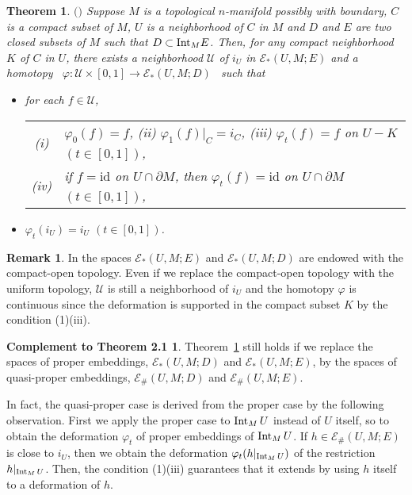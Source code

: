 \documentclass[11pt, fleqn]{amsart}
\newtheorem{theorem}{Theorem}[section]
\theoremstyle{definition}
\newtheorem{remark}{Remark}[section]
\newtheorem*{compl}{Complement to Theorem 2.1}
\newcommand{\cal}{\mathcal}
\renewcommand{\phi}{\varphi}
\newcommand{\lra}{\longrightarrow}
\newcommand{\id}{\mathrm{id}}
\newcommand{\U}{\mathcal U}
\begin{document}
\begin{theorem}\label{thm_basic_deform} $($\cite[Theorem 5.1]{EK}$)$  
Suppose $M$ is a topological $n$-manifold possibly with boundary,  
$C$ is a  compact subset of $M$, 
$U$ is a neighborhood of $C$ in $M$ and 
$D$ and $E$ are two closed subsets of $M$ such that $D \subset {\rm Int}_M E$.
Then, for any compact neighborhood $K$ of $C$ in $U$,  
there exists a neighborhood $\U$ of $i_U$ in ${\mathcal E}_\ast(U, M; E)$ 
and a homotopy \ 
$\varphi : \U \times [0, 1] \lra {\mathcal E}_\ast(U, M; D)$ \  such that 
\begin{itemize}
\item[{\rm (1)}]  for each $f \in {\cal U}$, 
\begin{tabular}[t]{c@{\ \,}l}
{\rm (i)} & $\varphi_0(f) = f$, \hspace{3mm} {\rm (ii)} 
$\varphi_1(f)|_C = i_C$, \hspace{3mm} {\rm (iii)} 
$\varphi_t(f) = f$ on $U - K$ $(t \in [0,1])$, \\[2mm] 
{\rm (iv)} & if $f = \id$ on $U \cap \partial M$, then $\varphi_t(f) = \id$ on $U \cap \partial M$ $(t \in [0,1])$, 
\end{tabular}
\vskip 1.5mm 
\item[{\rm (2)}] $\varphi_t(i_U) = i_U$ $(t \in [0,1])$. 
\end{itemize}
\end{theorem} 

\begin{remark}
In \cite{EK} the spaces ${\mathcal E}_\ast(U, M; E)$ and ${\mathcal E}_\ast(U, M; D)$ are endowed with the compact-open topology. Even if we replace the compact-open topology with the uniform topology, ${\cal U}$ is still a neighborhood of $i_U$ and the homotopy $\phi$ is continuous since 
the deformation is supported in the compact subset $K$ by the condition (1)(iii). 
\end{remark}

\begin{compl}\label{compl} Theorem~\ref{thm_basic_deform} still holds 
if we replace the spaces of proper embeddings, 
${\mathcal E}_\ast(U, M; D)$ and ${\mathcal E}_\ast(U, M; E)$,  
by the spaces of quasi-proper embeddings, 
${\mathcal E}_\#(U, M; D)$ and ${\mathcal E}_\#(U, M; E)$. 
\end{compl}

In fact, the quasi-proper case is derived from the proper case by the following observation. 
First we apply the proper case to ${\rm Int}_M\,U$ instead of $U$ itself, so to obtain the deformation $\phi_t$ of proper embeddings of ${\rm Int}_M\,U$. 
If $h \in {\mathcal E}_\#(U, M; E)$ is close to $i_U$, then 
we obtain the deformation $\phi_t(h|_{{\rm Int}_M\,U})$ of the restriction $h|_{{\rm Int}_M\,U}$.
Then, the condition (1)(iii) guarantees that it extends by using $h$ itself to a deformation of $h$. 
\end{document}
